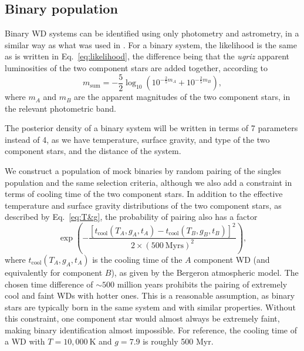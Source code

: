 \documentclass[fleqn,usenatbib]{mnras}
\newcommand{\Teff}{T}
\newcommand{\logg}{g}
\newcommand{\K}{\text{K}}
\begin{document}
\subsection{Binary population}

Binary WD systems can be identified using only photometry and astrometry, in a similar way as what was used in \cite{2018ApJ...857..114W}. For a binary system, the likelihood is the same as is written in Eq.~\eqref{eq:likelihood}, the difference being that the \emph{ugriz} apparent luminosities of the two component stars are added together, according to
\begin{equation}
	m_\text{sum} = - \frac{5}{2}\log_{10}\left( 10^{-\frac{2}{5}m_{A}}+10^{-\frac{2}{5}m_{B}}  \right),
\end{equation}
where $m_A$ and $m_B$ are the apparent magnitudes of the two component stars, in the relevant photometric band.

The posterior density of a binary system will be written in terms of 7 parameters instead of 4, as we have temperature, surface gravity, and type of the two component stars, and the distance of the system.

We construct a population of mock binaries by random pairing of the singles population and the same selection criteria, although we also add a constraint in terms of cooling time of the two component stars. In addition to the effective temperature and surface gravity distributions of the two component stars, as described by Eq.~\eqref{eq:T&g}, the probability of pairing also has a factor
\begin{equation}\label{eq:time_difference}
	\exp\left(
	-\frac{[t_\text{cool}(\Teff_A,\logg_A,t_A)-t_\text{cool}(\Teff_B,\logg_B,t_B)]^2}{2\times ( 500~\text{Myrs})^2}
	\right),
\end{equation}
where $t_\text{cool}(\Teff_A,\logg_A,t_A)$ is the cooling time of the $A$ component WD (and equivalently for component $B$), as given by the Bergeron atmospheric model. The chosen time difference of $\sim 500$ million years prohibits the pairing of extremely cool and faint WDs with hotter ones. This is a reasonable assumption, as binary stars are typically born in the same system and with similar properties. Without this constraint, one component star would almost always be extremely faint, making binary identification almost impossible. For reference, the cooling time of a WD with $\Teff=10,000~\K$ and $\logg=7.9$ is roughly 500 Myr.
\end{document}
